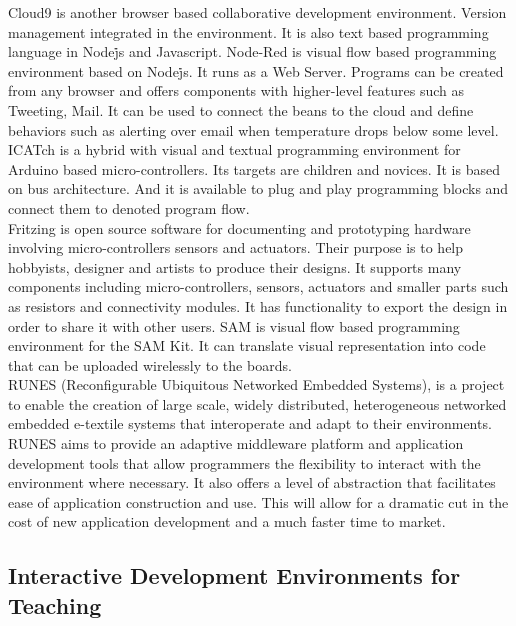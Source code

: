 Cloud9 is another browser based collaborative development environment. Version management integrated in the environment. It is also text based programming language in Node\.js and Javascript. Node-Red is visual flow based programming environment based on Node\.js. It runs as a Web Server. Programs can be created from any browser and offers components with higher-level features such as Tweeting, Mail. It can be used to connect the beans to the cloud and define behaviors such as alerting over email when temperature drops below some level. \\

I\*CATch is a hybrid with visual and textual programming environment for Arduino based micro-controllers. Its targets are children and novices. It is based on bus architecture. And it is available to plug and play programming blocks and connect them to denoted program flow.  \\

Fritzing is open source software for documenting and prototyping hardware involving micro-controllers sensors and actuators. Their purpose is to help hobbyists, designer and artists to produce their designs. It supports many components including micro-controllers, sensors, actuators and smaller parts such as resistors and connectivity modules. It has functionality to export the design in order to share it with other users. SAM is visual flow based programming environment for the SAM Kit. It can translate visual representation into code that can be uploaded wirelessly to the boards. \\

RUNES (Reconfigurable Ubiquitous Networked Embedded Systems), is a project to enable the creation of large scale, widely distributed, heterogeneous networked embedded e-textile systems that interoperate and adapt to their environments. RUNES aims to provide an adaptive middleware platform and application development tools that allow programmers the flexibility to interact with the environment where necessary. It also offers a level of abstraction that facilitates ease of application construction and use. This will allow for a dramatic cut in the cost of new application development and a much faster time to market. \\

\subsection{Interactive Development Environments for Teaching}

